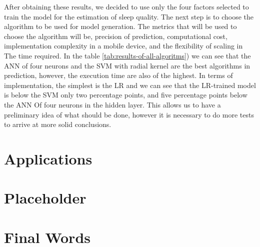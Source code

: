 \documentclass[]{book}
\begin{document}
After obtaining these results, we decided to use only the four factors
selected to train the model for the estimation of sleep quality. The
next step is to choose the algorithm to be used for model generation.
The metrics that will be used to choose the algorithm will be, precision
of prediction, computational cost, implementation complexity in a mobile
device, and the flexibility of scaling in The time required. In the
table \ref{tab:results-of-all-algoritms}) we can see that the ANN of
four neurons and the SVM with radial kernel are the best algorithms in
prediction, however, the execution time are also of the highest. In
terms of implementation, the simplest is the LR and we can see that the
LR-trained model is below the SVM only two percentage points, and five
percentage points below the ANN Of four neurons in the hidden layer.
This allows us to have a preliminary idea of what should be done,
however it is necessary to do more tests to arrive at more solid
conclusions.

\chapter{Applications}\label{applications}

\chapter{Placeholder}\label{placeholder}

\chapter{Final Words}\label{final-words}


\end{document}
